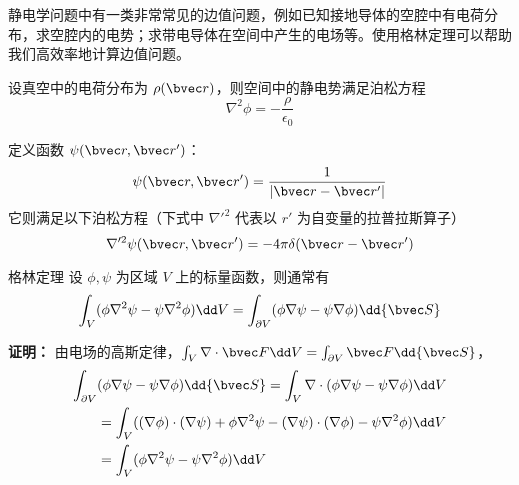 

静电学问题中有一类非常常见的边值问题，例如已知接地导体的空腔中有电荷分布，求空腔内的电势；求带电导体在空间中产生的电场等。使用格林定理可以帮助我们高效率地计算边值问题。

设真空中的电荷分布为 $\rho(\bvec r)$，则空间中的静电势满足泊松方程
\begin{equation}\label{EleGr_eq1}
\nabla^2 \phi = -\frac{\rho}{\epsilon_0}
\end{equation}

定义函数 $\psi(\bvec r,\bvec r')$：
\begin{equation}
\psi(\bvec r,\bvec r')=\frac{1}{|\bvec r-\bvec r'|}
\end{equation}
它则满足以下泊松方程（下式中 $\nabla'^2$ 代表以 $r'$ 为自变量的拉普拉斯算子）
\begin{equation}\label{EleGr_eq2}
\nabla'^2 \psi(\bvec r,\bvec r')=-4\pi\delta(\bvec r-\bvec r')
\end{equation}

\begin{theorem}{格林定理}
设 $\phi,\psi$ 为区域 $V$ 上的标量函数，则通常有
\begin{equation}\label{EleGr_eq3}
\int_V (\phi \nabla^2 \psi -\psi\nabla^2\phi)\dd V=\int_{\partial V}(\phi \nabla \psi-\psi\nabla\phi)\dd {\bvec S} 
\end{equation}
\end{theorem}
\textbf{证明：} 由电场的高斯定律，$\int_V \nabla\cdot \bvec F\dd V=\int_{\partial V}\bvec F \dd {\bvec S}$，
\begin{equation}
\begin{aligned}
\int_{\partial V}&(\phi\nabla\psi-\psi\nabla\phi)\dd{\bvec S}=\int_V \nabla \cdot (\phi\nabla\psi-\psi\nabla\phi)\dd V\\
&=\int_V((\nabla\phi)\cdot(\nabla\psi)+\phi\nabla^2\psi-(\nabla\psi)\cdot(\nabla\phi)-\psi\nabla^2\phi)\dd V\\
&=\int_V(\phi\nabla^2\psi-\psi\nabla^2\phi)\dd V
\end{aligned}
\end{equation}

